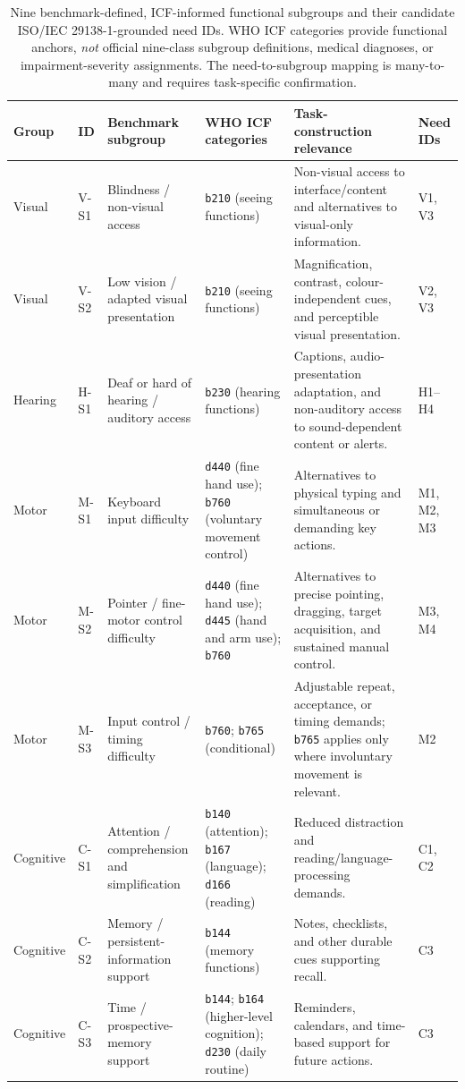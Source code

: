 \documentclass[11pt]{article}
\begin{document}
\begin{table}[t]
\centering
\scriptsize
\setlength{\tabcolsep}{3.2pt}
\renewcommand{\arraystretch}{1.12}
\begin{tabularx}{\textwidth}{@{}>{\raggedright\arraybackslash}p{} >{\raggedright\arraybackslash}p{} >{\raggedright\arraybackslash}p{} >{\raggedright\arraybackslash}p{} >{\raggedright\arraybackslash}X >{\raggedright\arraybackslash}p{}@{}}
\toprule
Group & ID & Benchmark subgroup & WHO ICF categories & Task-construction relevance & Need IDs \tabularnewline
\midrule
Visual & V-S1 & Blindness / non-visual access & \texttt{b210} (seeing functions) & Non-visual access to interface/content and alternatives to visual-only information. & V1, V3 \tabularnewline
Visual & V-S2 & Low vision / adapted visual presentation & \texttt{b210} (seeing functions) & Magnification, contrast, colour-independent cues, and perceptible visual presentation. & V2, V3 \tabularnewline
Hearing & H-S1 & Deaf or hard of hearing / auditory access & \texttt{b230} (hearing functions) & Captions, audio-presentation adaptation, and non-auditory access to sound-dependent content or alerts. & H1--H4 \tabularnewline
Motor & M-S1 & Keyboard input difficulty & \texttt{d440} (fine hand use); \texttt{b760} (voluntary movement control) & Alternatives to physical typing and simultaneous or demanding key actions. & M1, M2, M3 \tabularnewline
Motor & M-S2 & Pointer / fine-motor control difficulty & \texttt{d440} (fine hand use); \texttt{d445} (hand and arm use); \texttt{b760} & Alternatives to precise pointing, dragging, target acquisition, and sustained manual control. & M3, M4 \tabularnewline
Motor & M-S3 & Input control / timing difficulty & \texttt{b760}; \texttt{b765} (conditional) & Adjustable repeat, acceptance, or timing demands; \texttt{b765} applies only where involuntary movement is relevant. & M2 \tabularnewline
Cognitive & C-S1 & Attention / comprehension and simplification & \texttt{b140} (attention); \texttt{b167} (language); \texttt{d166} (reading) & Reduced distraction and reading/language-processing demands. & C1, C2 \tabularnewline
Cognitive & C-S2 & Memory / persistent-information support & \texttt{b144} (memory functions) & Notes, checklists, and other durable cues supporting recall. & C3 \tabularnewline
Cognitive & C-S3 & Time / prospective-memory support & \texttt{b144}; \texttt{b164} (higher-level cognition); \texttt{d230} (daily routine) & Reminders, calendars, and time-based support for future actions. & C3 \tabularnewline
\bottomrule
\end{tabularx}
\caption{Nine benchmark-defined, ICF-informed functional subgroups and their candidate ISO/IEC 29138-1-grounded need IDs. WHO ICF categories provide functional anchors, \emph{not} official nine-class subgroup definitions, medical diagnoses, or impairment-severity assignments. The need-to-subgroup mapping is many-to-many and requires task-specific confirmation.}
\label{tab:functional_subgroups}
\end{table}
\end{document}
